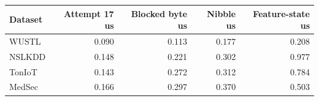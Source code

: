 \begin{tabular}{lrrrr}
\toprule
Dataset & Attempt 17 us & Blocked byte us & Nibble us & Feature-state us \\
\midrule
WUSTL & 0.090 & 0.113 & 0.177 & 0.208 \\
NSLKDD & 0.148 & 0.221 & 0.302 & 0.977 \\
TonIoT & 0.143 & 0.272 & 0.312 & 0.784 \\
MedSec & 0.166 & 0.297 & 0.370 & 0.503 \\
\bottomrule
\end{tabular}
